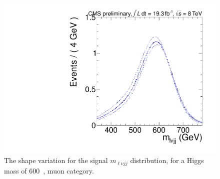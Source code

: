 \begin{figure}[t!]
  \begin{center}
    \includegraphics[width=0.5\linewidth]{plots/anaexample/HWW600_Mlvjj_SignalShape.pdf}
  \caption{The shape variation for the signal $m_{\ell\nu jj}$ distribution,
  for a Higgs mass of 600~\GeV, muon category. }
  \label{fig:sigshapeintfunc}
  \end{center}
\end{figure}





